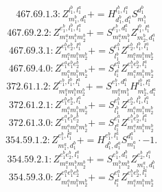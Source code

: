 \documentclass[letterpaper,10pt,fleqn,leqno,onecolumn]{article}
\begin{document}
\begin{equation} \;\;\;\;\;\;  467.69.1.3: Z^{l_{1}^{b},l_{1}^{a}}_{m_{1}^{b},d_{1}^{a}}+=H^{l_{1}^{b},l_{1}^{a}}_{d_{1}^{b},d_{1}^{a}}S^{d_{1}^{b}}_{m_{1}^{b}} \end{equation}
\begin{equation} \;\;\;\;\;\;  467.69.2.2: Z^{e_{1}^{b},l_{1}^{b},l_{1}^{a}}_{m_{1}^{a}m_{1}^{b}m_{2}^{b}}+=S^{e_{1}^{b},d_{1}^{a}}_{m_{1}^{a}m_{1}^{b}}Z^{l_{1}^{b},l_{1}^{a}}_{m_{2}^{b},d_{1}^{a}} \end{equation}
\begin{equation} \;\;\;\;\;\;  467.69.3.1: Z^{e_{1}^{b}e_{2}^{b},l_{1}^{a}}_{m_{1}^{a}m_{1}^{b}m_{2}^{b}}+=S^{e_{1}^{b}}_{l_{1}^{b}}Z^{e_{2}^{b},l_{1}^{b},l_{1}^{a}}_{m_{1}^{a}m_{1}^{b}m_{2}^{b}} \end{equation}
\begin{equation} \;\;\;\;\;\;  467.69.4.0: Z^{e_{1}^{a}e_{1}^{b}e_{2}^{b}}_{m_{1}^{a}m_{1}^{b}m_{2}^{b}}+=S^{e_{1}^{a}}_{l_{1}^{a}}Z^{e_{1}^{b}e_{2}^{b},l_{1}^{a}}_{m_{1}^{a}m_{1}^{b}m_{2}^{b}} \end{equation}
\begin{equation} \;\;\;\;\;\;  372.61.1.2: Z^{e_{1}^{b},l_{1}^{b},l_{1}^{a}}_{m_{1}^{a}m_{1}^{b}m_{2}^{b}}+=S^{e_{1}^{b},d_{1}^{a}}_{m_{1}^{a}m_{1}^{b}}H^{l_{1}^{b},l_{1}^{a}}_{m_{2}^{b},d_{1}^{a}} \end{equation}
\begin{equation} \;\;\;\;\;\;  372.61.2.1: Z^{e_{1}^{b}e_{2}^{b},l_{1}^{a}}_{m_{1}^{a}m_{1}^{b}m_{2}^{b}}+=S^{e_{1}^{b}}_{l_{1}^{b}}Z^{e_{2}^{b},l_{1}^{b},l_{1}^{a}}_{m_{1}^{a}m_{1}^{b}m_{2}^{b}} \end{equation}
\begin{equation} \;\;\;\;\;\;  372.61.3.0: Z^{e_{1}^{a}e_{1}^{b}e_{2}^{b}}_{m_{1}^{a}m_{1}^{b}m_{2}^{b}}+=S^{e_{1}^{a}}_{l_{1}^{a}}Z^{e_{1}^{b}e_{2}^{b},l_{1}^{a}}_{m_{1}^{a}m_{1}^{b}m_{2}^{b}} \end{equation}
\begin{equation} \;\;\;\;\;\;  354.59.1.2: Z^{e_{1}^{b},l_{1}^{a}}_{m_{1}^{a},d_{1}^{b}}+=H^{e_{1}^{b},l_{1}^{a}}_{d_{1}^{b},d_{1}^{a}}S^{d_{1}^{a}}_{m_{1}^{a}}\cdot -1. \end{equation}
\begin{equation} \;\;\;\;\;\;  354.59.2.1: Z^{e_{1}^{b}e_{2}^{b},l_{1}^{a}}_{m_{1}^{a}m_{1}^{b}m_{2}^{b}}+=S^{e_{1}^{b},d_{1}^{b}}_{m_{1}^{b}m_{2}^{b}}Z^{e_{2}^{b},l_{1}^{a}}_{m_{1}^{a},d_{1}^{b}} \end{equation}
\begin{equation} \;\;\;\;\;\;  354.59.3.0: Z^{e_{1}^{a}e_{1}^{b}e_{2}^{b}}_{m_{1}^{a}m_{1}^{b}m_{2}^{b}}+=S^{e_{1}^{a}}_{l_{1}^{a}}Z^{e_{1}^{b}e_{2}^{b},l_{1}^{a}}_{m_{1}^{a}m_{1}^{b}m_{2}^{b}} \end{equation}
\end{document}
